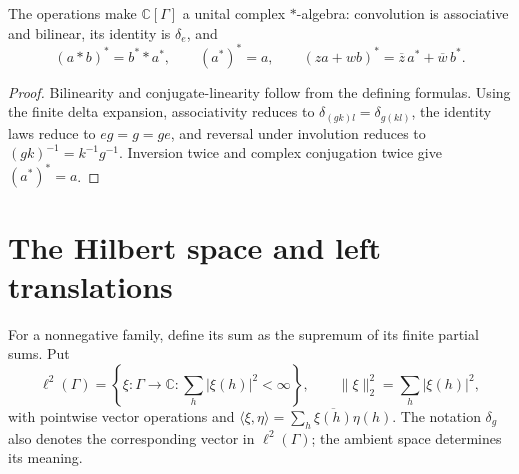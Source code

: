 \begin{proposition}\label{prop:group-algebra-star-laws}
\leanok
{}
The operations make $\mathbb C[\Gamma]$ a unital complex $*$-algebra:
convolution is associative and bilinear, its identity is $\delta_e$, and
\[
 (a*b)^*=b^**a^*,\qquad (a^*)^*=a,\qquad
 (za+wb)^*=\overline z\,a^*+\overline w\,b^*.
\]
\end{proposition}
\begin{proof}
\leanok
Bilinearity and conjugate-linearity follow from the defining formulas.
Using the finite delta expansion, associativity reduces to
$\delta_{(gk)l}=\delta_{g(kl)}$, the identity laws reduce to $eg=g=ge$,
and reversal under involution reduces to $(gk)^{-1}=k^{-1}g^{-1}$.
Inversion twice and complex conjugation twice give $(a^*)^*=a$.
\end{proof}

\section{The Hilbert space and left translations}

\begin{definition}\label{def:l2-group}
\leanok
For a nonnegative family, define its sum as the supremum of its finite
partial sums. Put
\[
 \ell^2(\Gamma)=\left\{\xi:\Gamma\to\mathbb C:
                  \sum_h|\xi(h)|^2<\infty\right\},\qquad
 \|\xi\|_2^2=\sum_h|\xi(h)|^2,
\]
with pointwise vector operations and
$\langle\xi,\eta\rangle=\sum_h\overline{\xi(h)}\eta(h)$.
The notation $\delta_g$ also denotes the corresponding vector in
$\ell^2(\Gamma)$; the ambient space determines its meaning.
\end{definition}

